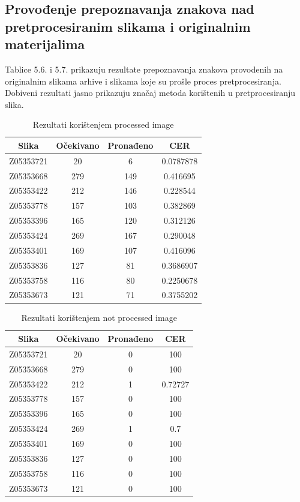 \documentclass[times, utf8, zavrsni, numeric]{fer}
\begin{document}
\subsection{Provođenje prepoznavanja znakova nad pretprocesiranim slikama i originalnim materijalima}
Tablice 5.6. i 5.7. prikazuju rezultate prepoznavanja znakova provodenih na originalnim slikama arhive i slikama koje su prošle proces pretprocesiranja. Dobiveni rezultati jasno prikazuju značaj metoda korištenih u pretprocesiranju slika.
\begin{table}[H]
	\caption{Rezultati korištenjem processed image}
        \label{tbl:Blur 2}
        \centering
        \begin{tabular}{ |*{4}{c|} } \hline
	\multicolumn{1}{|c|}{Slika} & \multicolumn{1}{|c|}{Očekivano} & \multicolumn{1}{|c|}{Pronađeno} & \multicolumn{1}{|c|}{CER}\\ \hline
Z05353721&20&6&0.0787878\\ \hline
Z05353668&279&149&0.416695\\ \hline
Z05353422&212&146&0.228544\\ \hline
Z05353778&157&103&0.382869\\ \hline
Z05353396&165&120&0.312126\\ \hline
Z05353424&269&167&0.290048\\ \hline
Z05353401&169&107&0.416096\\ \hline
Z05353836&127&81&0.3686907\\ \hline
Z05353758&116&80&0.2250678\\ \hline
Z05353673&121&71&0.3755202\\ \hline
	\end{tabular}
\end{table}

\begin{table}[H]
	\caption{Rezultati korištenjem not processed image}
        \label{tbl:Blur 2}
        \centering
        \begin{tabular}{ |*{4}{c|} } \hline
	\multicolumn{1}{|c|}{Slika} & \multicolumn{1}{|c|}{Očekivano} & \multicolumn{1}{|c|}{Pronađeno} & \multicolumn{1}{|c|}{CER}\\ \hline
Z05353721&20&0&100\\ \hline
Z05353668&279&0&100\\ \hline
Z05353422&212&1&0.72727\\ \hline
Z05353778&157&0&100\\ \hline
Z05353396&165&0&100\\ \hline
Z05353424&269&1&0.7\\ \hline
Z05353401&169&0&100\\ \hline
Z05353836&127&0&100\\ \hline
Z05353758&116&0&100\\ \hline
Z05353673&121&0&100\\ \hline
	\end{tabular}
\end{table}
\end{document}
